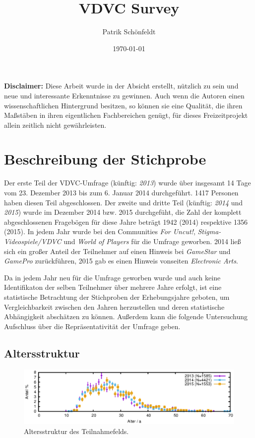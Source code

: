 \documentclass[11pt]{scrartcl}
\title{VDVC Survey}
\author{Patrik Schönfeldt}
\date{\today}
\begin{document}
\maketitle

\textbf{Disclaimer:} Diese Arbeit wurde in der Absicht erstellt,
nützlich zu sein und neue und interessante Erkenntnisse zu gewinnen.
Auch wenn die Autoren einen wissenschaftlichen Hintergrund besitzen,
so können sie eine Qualität,
die ihren Maßstäben in ihren eigentlichen Fachbereichen genügt,
für dieses Freizeitprojekt allein zeitlich nicht gewährleisten.

\section{Beschreibung der Stichprobe}
Der erste Teil der VDVC-Umfrage (künftig: \emph{2013})
wurde über insgesamt 14 Tage
vom 23. Dezember 2013 bis zum 6. Januar 2014 durchgeführt.
1417 Personen haben diesen Teil abgeschlossen.
Der zweite und dritte Teil (künftig: \emph{2014} und \emph{2015})
wurde im Dezember 2014 bzw. 2015 durchgefüht,
die Zahl der komplett abgeschlossenen Fragebögen für diese Jahre beträgt 
1942 (2014) respektive 1356 (2015).
In jedem Jahr wurde bei den Communities \emph{For Uncut!},
\emph{Stigma-Videospiele/VDVC} und \emph{World of Players} für die Umfrage
geworben.
2014 ließ sich ein großer Anteil der Teilnehmer auf einen
Hinweis bei \emph{GameStar} und \emph{GamePro} zurückführen,
2015 gab es einen Hinweis vonseiten \emph{Electronic Arts}.

Da in jedem Jahr neu für die Umfrage geworben wurde und auch keine
Identifikaton der selben Teilnehmer über mehrere Jahre erfolgt,
ist eine statistische Betrachtung der Stichproben der Erhebungsjahre
geboten,
um Vergleichbarkeit zwischen den Jahren herzustellen und deren
statistische Abhängigkeit abschätzen zu können.
Außerdem kann die folgende Untersuchung
Aufschluss über die Repräsentativität der Umfrage geben.


\subsection{Altersstruktur}

\begin{figure}[htb]
	\centering
	\includegraphics[width=15cm]{vgl/alter}
	\caption[Altersstruktur]
	{Altersstruktur des Teilnahmefelds.}
	\label{fig: alter}
\end{figure}
\end{document}
